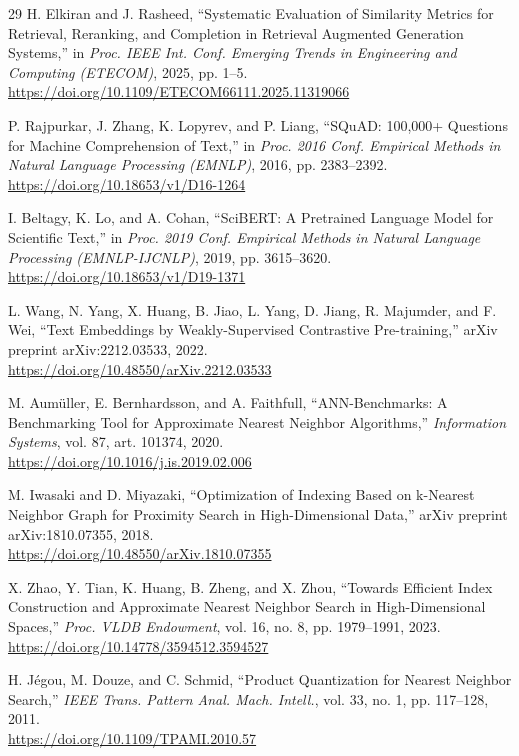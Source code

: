 \documentclass[runningheads]{llncs}
\begin{document}
\begin{thebibliography}{29}
H. Elkiran and J. Rasheed, ``Systematic Evaluation of Similarity Metrics for
Retrieval, Reranking, and Completion in Retrieval Augmented Generation Systems,''
in \textit{Proc. IEEE Int. Conf. Emerging Trends in Engineering and Computing
(ETECOM)}, 2025, pp. 1--5.\\
\url{https://doi.org/10.1109/ETECOM66111.2025.11319066}

P. Rajpurkar, J. Zhang, K. Lopyrev, and P. Liang, ``SQuAD: 100,000+ Questions for
Machine Comprehension of Text,'' in \textit{Proc. 2016 Conf. Empirical Methods in
Natural Language Processing (EMNLP)}, 2016, pp. 2383--2392.\\
\url{https://doi.org/10.18653/v1/D16-1264}

I. Beltagy, K. Lo, and A. Cohan, ``SciBERT: A Pretrained Language Model for
Scientific Text,'' in \textit{Proc. 2019 Conf. Empirical Methods in Natural
Language Processing (EMNLP-IJCNLP)}, 2019, pp. 3615--3620.\\
\url{https://doi.org/10.18653/v1/D19-1371}

L. Wang, N. Yang, X. Huang, B. Jiao, L. Yang, D. Jiang, R. Majumder, and F. Wei,
``Text Embeddings by Weakly-Supervised Contrastive Pre-training,'' arXiv preprint
arXiv:2212.03533, 2022.\\
\url{https://doi.org/10.48550/arXiv.2212.03533}

M. Aum\"uller, E. Bernhardsson, and A. Faithfull, ``ANN-Benchmarks: A Benchmarking Tool
for Approximate Nearest Neighbor Algorithms,'' \textit{Information Systems}, vol. 87,
art. 101374, 2020.\\
\url{https://doi.org/10.1016/j.is.2019.02.006}

M. Iwasaki and D. Miyazaki, ``Optimization of Indexing Based on k-Nearest Neighbor
Graph for Proximity Search in High-Dimensional Data,'' arXiv preprint
arXiv:1810.07355, 2018.\\
\url{https://doi.org/10.48550/arXiv.1810.07355}

X. Zhao, Y. Tian, K. Huang, B. Zheng, and X. Zhou, ``Towards Efficient Index
Construction and Approximate Nearest Neighbor Search in High-Dimensional Spaces,''
\textit{Proc. VLDB Endowment}, vol. 16, no. 8, pp. 1979--1991, 2023.\\
\url{https://doi.org/10.14778/3594512.3594527}

H. J\'egou, M. Douze, and C. Schmid, ``Product Quantization for Nearest Neighbor
Search,'' \textit{IEEE Trans. Pattern Anal. Mach. Intell.}, vol. 33, no. 1,
pp. 117--128, 2011.\\
\url{https://doi.org/10.1109/TPAMI.2010.57}


\end{thebibliography}
\end{document}
